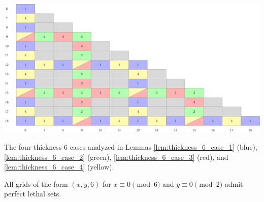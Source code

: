 


\begin{table}[]
\centering
\includegraphics[width=\textwidth]{tables/4/thickness_6_cases.pdf}
\caption{The four thickness 6 cases analyzed in Lemmas \ref{lem:thickness_6_case_1} (blue), \ref{lem:thickness_6_case_2} (green), \ref{lem:thickness_6_case_3} (red), and \ref{lem:thickness_6_case_4} (yellow).}
\label{fig:thickness_6_cases}
\end{table}

\begin{lem}
\label{lem:thickness_6_case_1}
All grids of the form $(x,y,6)$ for $x \equiv 0 \pmod 6$ and $y \equiv 0 \pmod 2$ admit perfect lethal sets.
\end{lem}

